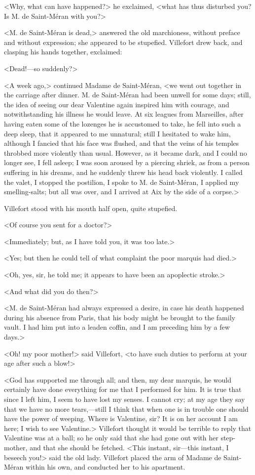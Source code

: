  <Why, what can have happened?> he exclaimed, <what has thus disturbed you? Is M. de Saint-Méran with you?> 

 <M. de Saint-Méran is dead,> answered the old marchioness, without preface and without expression; she appeared to be stupefied. Villefort drew back, and clasping his hands together, exclaimed: 

 <Dead!—so suddenly?> 

 <A week ago,> continued Madame de Saint-Méran, <we went out together in the carriage after dinner. M. de Saint-Méran had been unwell for some days; still, the idea of seeing our dear Valentine again inspired him with courage, and notwithstanding his illness he would leave. At six leagues from Marseilles, after having eaten some of the lozenges he is accustomed to take, he fell into such a deep sleep, that it appeared to me unnatural; still I hesitated to wake him, although I fancied that his face was flushed, and that the veins of his temples throbbed more violently than usual. However, as it became dark, and I could no longer see, I fell asleep; I was soon aroused by a piercing shriek, as from a person suffering in his dreams, and he suddenly threw his head back violently. I called the valet, I stopped the postilion, I spoke to M. de Saint-Méran, I applied my smelling-salts; but all was over, and I arrived at Aix by the side of a corpse.> 

 Villefort stood with his mouth half open, quite stupefied. 

 <Of course you sent for a doctor?> 

 <Immediately; but, as I have told you, it was too late.> 

 <Yes; but then he could tell of what complaint the poor marquis had died.> 

 <Oh, yes, sir, he told me; it appears to have been an apoplectic stroke.> 

 <And what did you do then?> 

 <M. de Saint-Méran had always expressed a desire, in case his death happened during his absence from Paris, that his body might be brought to the family vault. I had him put into a leaden coffin, and I am preceding him by a few days.> 

 <Oh! my poor mother!> said Villefort, <to have such duties to perform at your age after such a blow!> 

 <God has supported me through all; and then, my dear marquis, he would certainly have done everything for me that I performed for him. It is true that since I left him, I seem to have lost my senses. I cannot cry; at my age they say that we have no more tears,—still I think that when one is in trouble one should have the power of weeping. Where is Valentine, sir? It is on her account I am here; I wish to see Valentine.>  Villefort thought it would be terrible to reply that Valentine was at a ball; so he only said that she had gone out with her step-mother, and that she should be fetched. <This instant, sir—this instant, I beseech you!> said the old lady. Villefort placed the arm of Madame de Saint-Méran within his own, and conducted her to his apartment. 

